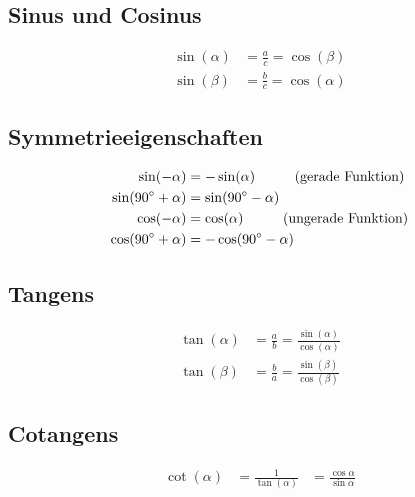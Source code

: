 


	\subsection{Sinus und Cosinus}
		\begin{emphbox}
			\begin{align*}
				\sin(\alpha) &= \frac{a}{c} = \cos(\beta) \\
				\sin(\beta) &= \frac{b}{c} = \cos(\alpha)
			\end{align*}
		\end{emphbox}

	\subsection{Symmetrieeigenschaften}
		\begin{emphbox}
			\begin{align*}
			\sin (-\alpha) &= -\sin(\alpha) \hspace{1cm}\text{(gerade Funktion)} \\
			\sin (90 \degree + \alpha) &= \sin (90 \degree - \alpha) \\
			\cos (-\alpha) &= \cos(\alpha) \hspace{1cm}\text{(ungerade Funktion)} \\
			\cos (90 \degree + \alpha) &= -\cos (90 \degree - \alpha)
			\end{align*}
		\end{emphbox}


	\subsection{Tangens}
		\begin{emphbox}
			\begin{align*}
			\tan(\alpha) &= \frac{a}{b} = \frac{\sin(\alpha)}{\cos(\alpha)} \\
			\tan(\beta) &= \frac{b}{a} = \frac{\sin(\beta)}{\cos(\beta)}
			\end{align*}
		\end{emphbox}
		
	\subsection{Cotangens}
		\begin{emphbox}
			\begin{align*}
			\cot(\alpha) &= \frac{1}{\tan(\alpha)} &= \frac{\cos \alpha}{\sin \alpha} 		
			\end{align*}
		\end{emphbox}

